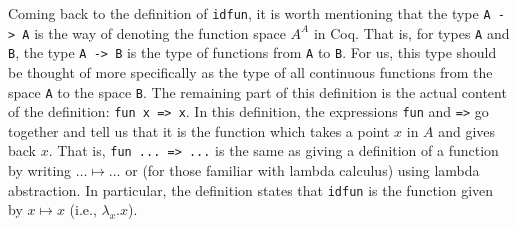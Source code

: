 Coming back to the definition of \verb|idfun|, it is worth
mentioning that the type \verb|A -> A| is the way of denoting the
function space $A^{A}$ in Coq.  That is, for types \verb|A| and
\verb|B|, the type \verb|A -> B| is the type of functions
from \verb|A| to \verb|B|.  For us, this type should be
thought of more specifically as the type of all continuous functions
from the space \verb|A| to the space \verb|B|.  The
remaining part of this definition is the actual content of the
definition: \verb|fun x => x|.  In this definition, the
expressions \verb|fun| and \verb|=>| go together and tell us
that it is the function which takes a point $x$ in $A$ and gives back $x$.
That is, \verb|fun ... => ...| is the same as giving a definition
of a function by writing $\ldots\mapsto\ldots$ or (for those familiar
with lambda calculus) using lambda abstraction.  In particular, the
definition states that \verb|idfun| is the function given by
$x\mapsto x$ (i.e., $\lambda_{x}.x$).


